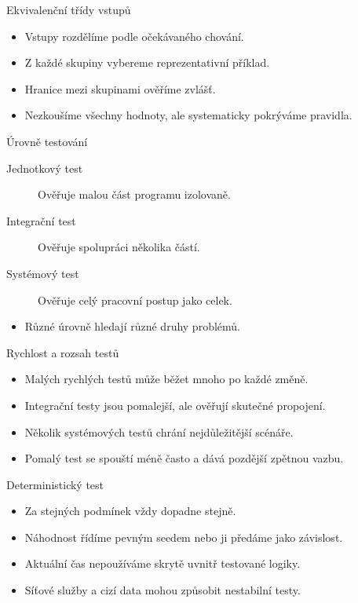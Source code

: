 \documentclass[aspectratio=169]{beamer}
\begin{document}
\begin{frame}{Ekvivalenční třídy vstupů}
\begin{itemize}
\item Vstupy rozdělíme podle očekávaného chování.
\item Z každé skupiny vybereme reprezentativní příklad.
\item Hranice mezi skupinami ověříme zvlášť.
\item Nezkoušíme všechny hodnoty, ale systematicky pokrýváme pravidla.
\end{itemize}
\end{frame}

\begin{frame}{Úrovně testování}
\begin{description}
\item[Jednotkový test] Ověřuje malou část programu izolovaně.
\item[Integrační test] Ověřuje spolupráci několika částí.
\item[Systémový test] Ověřuje celý pracovní postup jako celek.
\end{description}
\begin{itemize}\item Různé úrovně hledají různé druhy problémů.\end{itemize}
\end{frame}

\begin{frame}{Rychlost a rozsah testů}
\begin{itemize}
\item Malých rychlých testů může běžet mnoho po každé změně.
\item Integrační testy jsou pomalejší, ale ověřují skutečné propojení.
\item Několik systémových testů chrání nejdůležitější scénáře.
\item Pomalý test se spouští méně často a dává pozdější zpětnou vazbu.
\end{itemize}
\end{frame}

\begin{frame}{Deterministický test}
\begin{itemize}
\item Za stejných podmínek vždy dopadne stejně.
\item Náhodnost řídíme pevným seedem nebo ji předáme jako závislost.
\item Aktuální čas nepoužíváme skrytě uvnitř testované logiky.
\item Síťové služby a cizí data mohou způsobit nestabilní testy.
\end{itemize}
\end{frame}
\end{document}
